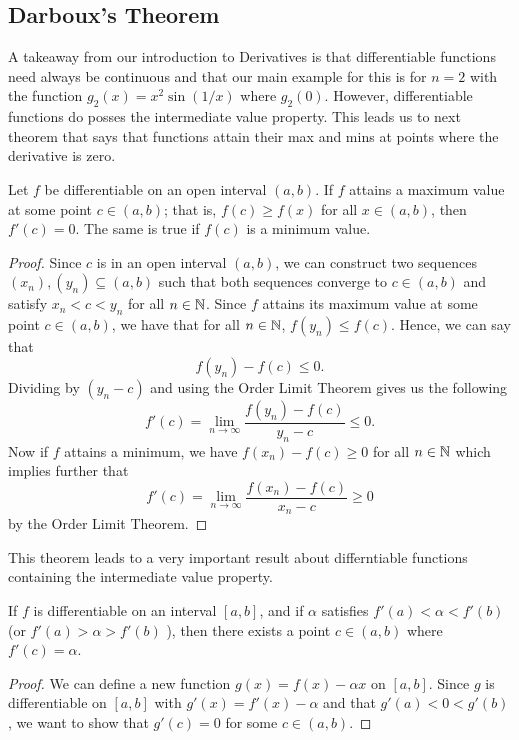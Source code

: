 \subsection{Darboux's Theorem}

A takeaway from our introduction to Derivatives is that differentiable functions need always be continuous and that our main example for this is for \( n = 2  \) with the function \( g_2(x) = x^2 \sin( 1 / x) \) where \( g_2(0)  \). However, differentiable functions do posses the intermediate value property. This leads us to next theorem that says that functions attain their max and mins at points where the derivative is zero. 

\begin{theorem} Let \( f  \) be differentiable on an open interval \( (a,b)  \). If \( f  \) attains a maximum value at some point \( c \in (a,b)  \); that is, \( f(c) \geq f(x)  \) for all \( x \in (a,b)  \), then \( f'(c) = 0  \). The same is true if \( f(c)  \) is a minimum value.

\end{theorem}

\begin{proof}
    Since \( c  \) is in an open interval \( (a,b) \), we can construct two sequences \( (x_n), (y_n) \subseteq (a,b)  \) such that both sequences converge to \( c \in (a,b)  \) and satisfy \( x_n < c < y_n  \) for all \( n \in \mathbb{N}  \). Since \( f  \) attains its maximum value at some point \( c \in (a,b)  \), we have that for all \( n \in \mathbb{N}  \), \( f(y_n) \leq f(c)  \). Hence, we can say that 
    \[  f(y_n) - f(c) \leq 0. \]
    Dividing by \( (y_n - c ) \) and using the Order Limit Theorem gives us the following
    \[  f'(c) = \lim_{ n \to \infty   } \frac{ f(y_n) - f(c)  }{ y_n - c  } \leq 0 \tag{1}. \]
    Now if \( f  \) attains a minimum, we have \( f(x_n) - f(c) \geq 0  \) for all \( n \in \mathbb{N}  \) which implies further that 
    \[  f'(c) = \lim_{ n \to \infty  } \frac{ f(x_n) - f(c)  }{ x_n - c  } \geq 0 \]
    by the Order Limit Theorem.
\end{proof}

This theorem leads to a very important result about differntiable functions containing the intermediate value property.

\begin{theorem}
    If \( f  \) is differentiable on an interval \( [a,b]  \), and if \( \alpha  \) satisfies \( f'(a) < \alpha < f'(b)  \) (or \( f'(a) > \alpha > f'(b)  \) ), then there exists a point \( c \in (a,b)  \) where \( f'(c) = \alpha \).
    \end{theorem}

\begin{proof}
    We can define a new function \( g(x) = f(x) - \alpha x  \) on \( [a,b]  \). Since \( g  \) is differentiable on \( [a,b]  \) with \( g'(x)  = f'(x) - \alpha  \) and that \( g'(a) < 0 < g'(b)  \), we want to show that \( g'(c) = 0  \) for some \( c \in (a,b)  \).
\end{proof}

